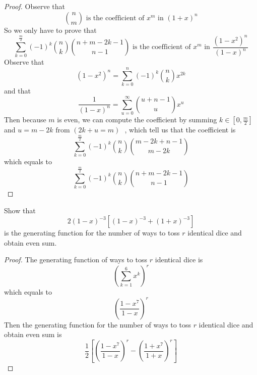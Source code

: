 \documentclass{report}
\begin{document}
\begin{proof}
Observe that 
\begin{equation*}
\binom{n}{m}\text{ is the coefficient of $x^m$ in } \left(1+x \right)^n
\end{equation*}
So we only have to prove that 
\begin{equation*}
\sum_{k=0}^{\frac{m}{2}}\left(-1 \right)^k \binom{n}{k} \binom{n+m-2k-1}{n-1}\text{ is the coefficient of $x^m$ in }\frac{\left(1-x^2 \right)^n}{\left(1-x \right)^n}
\end{equation*}
Observe that 
\begin{equation*}
  \left(1-x^2 \right)^n=\sum_{k=0}^n \left(-1 \right)^k \binom{n}{k} x^{2k}
\end{equation*}
and that 
\begin{equation*}
  \frac{1}{\left(1-x \right)^n}=\sum_{u=0}^\infty \binom{u+n-1}{u} x^u
\end{equation*}
Then because $m$ is even, we can compute the coefficient by summing $k\in \left[0,\frac{m}{2} \right]$ and $u=m-2k\text{ from $\left(2k+u=m \right)$ }$, which tell us that the coefficient is 
 \begin{equation*}
 \sum_{k=0}^{\frac{m}{2}}\left(-1 \right)^k \binom{n}{k}\binom{m-2k+n-1}{m-2k}
\end{equation*}
which equals to 
\begin{equation*}
\sum_{k=0}^{\frac{m}{2}} \left(-1 \right)^k \binom{n}{k} \binom{n+m-2k-1}{n-1}
\end{equation*}



\end{proof}
\begin{question}{}{}
Show that 
\begin{equation*}
2\left(1-x \right)^{-3}\left[\left(1-x \right)^{-3}+\left(1+x \right)^{-3} \right]
\end{equation*}
is the generating function for the number of ways to toss $r$ identical dice and obtain even sum.
\end{question}
\begin{proof}
The generating function of ways to toss $r$ identical dice is 
\begin{equation*}
  \left( \sum_{k=1}^6 x^k\right)^r
\end{equation*}
which equals to
\begin{equation*}
  \left(\frac{1-x^7}{1-x} \right)^r
\end{equation*}
Then the generating function for the number of ways to toss $r$ identical dice and obtain even sum is
\begin{equation*}
  \frac{1}{2}\left[ \left(\frac{1-x^7}{1-x} \right)^r - \left(\frac{1+x^7}{1+x}\right)^r\right]
\end{equation*}
\end{proof}
\end{document}
